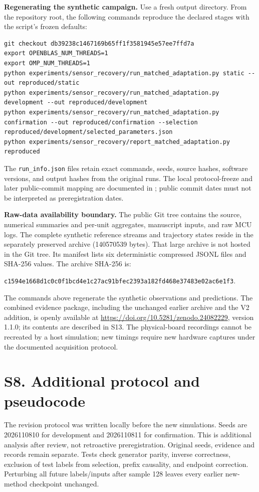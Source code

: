 \documentclass[10pt,letterpaper]{article}
\begin{document}
\textbf{Regenerating the synthetic campaign.} Use a fresh output directory. From the repository root, the following commands reproduce the declared stages with the script's frozen defaults:
\begin{lstlisting}
git checkout db39238c1467169b65ff1f3581945e57ee7ffd7a
export OPENBLAS_NUM_THREADS=1
export OMP_NUM_THREADS=1
python experiments/sensor_recovery/run_matched_adaptation.py static --out reproduced/static
python experiments/sensor_recovery/run_matched_adaptation.py development --out reproduced/development
python experiments/sensor_recovery/run_matched_adaptation.py confirmation --out reproduced/confirmation --selection reproduced/development/selected_parameters.json
python experiments/sensor_recovery/report_matched_adaptation.py reproduced
\end{lstlisting}
The \texttt{run\_info.json} files retain exact commands, seeds, source hashes, software versions, and output hashes from the original runs. The local protocol-freeze and later public-commit mapping are documented in ; public commit dates must not be interpreted as preregistration dates.

\textbf{Raw-data availability boundary.} The public Git tree contains the source, numerical summaries and per-unit aggregates, manuscript inputs, and raw MCU logs. The complete synthetic reference streams and trajectory states reside in the separately preserved archive  (140570539 bytes). That large archive is not hosted in the Git tree. Its manifest lists six deterministic compressed JSONL files and SHA-256 values. The archive SHA-256 is:
\begin{center}\scriptsize\texttt{c1594e1668d1c0c0f1bcd4e1c27ac91bfec2393a182fd468e37483e02ac6e1f3}.\end{center}
The commands above regenerate the synthetic observations and predictions. The combined evidence package, including the unchanged earlier archive and the V2 addition, is openly available at \url{https://doi.org/10.5281/zenodo.24082229}, version 1.1.0; its contents are described in S13. The physical-board recordings cannot be recreated by a host simulation; new timings require new hardware captures under the documented acquisition protocol.



\clearpage
\section*{S8. Additional protocol and pseudocode}
The revision protocol was written locally before the new simulations. Seeds are 2026110810 for development and 2026110811 for confirmation. This is additional analysis after review, not retroactive preregistration. Original seeds, evidence and records remain separate. Tests check generator parity, inverse correctness, exclusion of test labels from selection, prefix causality, and endpoint correction. Perturbing all future labels/inputs after sample 128 leaves every earlier new-method checkpoint unchanged.
\end{document}
